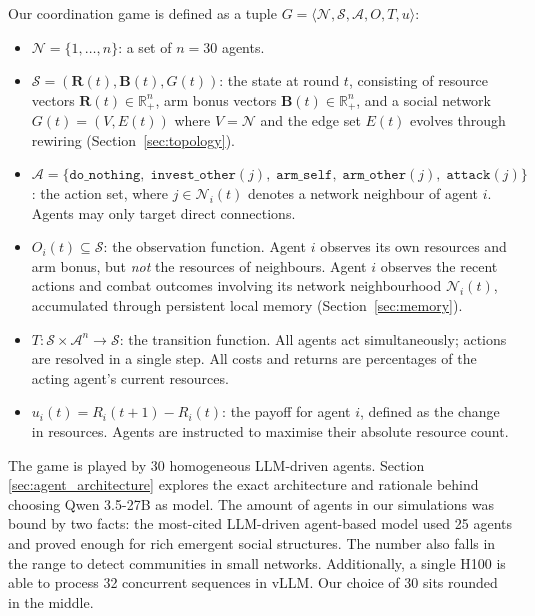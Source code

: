 Our coordination game is defined as a tuple $G = \langle \mathcal{N}, \mathcal{S}, \mathcal{A}, O, T, u \rangle$:

\begin{itemize}
    \item $\mathcal{N} = \{1, \ldots, n\}$: a set of $n = 30$ agents.
    \item $\mathcal{S} = (\mathbf{R}(t), \mathbf{B}(t), G(t))$: the state at round $t$, consisting of resource vectors $\mathbf{R}(t) \in \mathbb{R}_{+}^{n}$, arm bonus vectors $\mathbf{B}(t) \in \mathbb{R}_{+}^{n}$, and a social network $G(t) = (V, E(t))$ where $V = \mathcal{N}$ and the edge set $E(t)$ evolves through rewiring (Section~\ref{sec:topology}).
    \item $\mathcal{A} = \{\texttt{do\_nothing},\; \texttt{invest\_other}(j),\; \texttt{arm\_self},\; \texttt{arm\_other}(j),\; \texttt{attack}(j)\}$: the action set, where $j \in \mathcal{N}_i(t)$ denotes a network neighbour of agent $i$. Agents may only target direct connections.
    \item $O_i(t) \subseteq \mathcal{S}$: the observation function. Agent $i$ observes its own resources and arm bonus, but \textit{not} the resources of neighbours. Agent $i$ observes the recent actions and combat outcomes involving its network neighbourhood $\mathcal{N}_i(t)$, accumulated through persistent local memory (Section~\ref{sec:memory}).
    \item $T: \mathcal{S} \times \mathcal{A}^n \rightarrow \mathcal{S}$: the transition function. All agents act simultaneously; actions are resolved in a single step. All costs and returns are percentages of the acting agent's current resources.
    \item $u_i(t) = R_i(t+1) - R_i(t)$: the payoff for agent $i$, defined as the change in resources. Agents are instructed to maximise their absolute resource count.
\end{itemize}

The game is played by 30 homogeneous LLM-driven agents. Section \ref{sec:agent_architecture} explores the exact architecture and rationale behind choosing Qwen 3.5-27B as model. 
The amount of agents in our simulations was bound by two facts: the most-cited LLM-driven agent-based model used 25 agents and proved enough for rich emergent social structures. 
The number also falls in the range to detect communities in small networks. %
Additionally, a single H100 is able to process 32 concurrent sequences in vLLM. Our choice of 30 sits rounded in the middle. 

